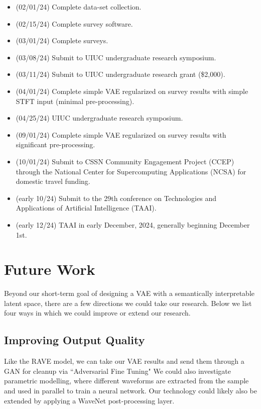 \documentclass{article}
\begin{document}
\begin{itemize}
    \item (02/01/24) Complete data-set collection.
    \item (02/15/24) Complete survey software.
    \item (03/01/24) Complete surveys.
    \item (03/08/24) Submit to UIUC undergraduate research symposium.
    \item (03/11/24) Submit to UIUC undergraduate research grant (\$2,000).
    \item (04/01/24) Complete simple VAE regularized on survey results with simple STFT input (minimal pre-processing).
    \item (04/25/24) UIUC undergraduate research symposium.
    \item (09/01/24) Complete simple VAE regularized on survey results with significant pre-processing.
    \item (10/01/24) Submit to CSSN Community Engagement Project (CCEP) through the National Center for Supercomputing Applications (NCSA) for domestic travel funding.
    \item (early 10/24) Submit to the 29th conference on Technologies and Applications of Artificial Intelligence (TAAI).
    \item (early 12/24) TAAI in early December, 2024, generally beginning December 1st.
\end{itemize}


\section{Future Work}
Beyond our short-term goal of designing a VAE with a semantically interpretable latent space, there are a few directions we could take our research. Below we list four ways in which we could improve or extend our research.

\subsection{Improving Output Quality}

Like the RAVE model, we can take our VAE results and send them through a GAN for cleanup via ``Adversarial Fine Tuning" \cite{Caillon2021} We could also investigate parametric modelling, where different waveforms are extracted from the sample and used in parallel to train a neural network. \cite{Subramani2020} Our technology could likely also be extended by applying a WaveNet post-processing layer. \cite{Kim2019}
\end{document}
